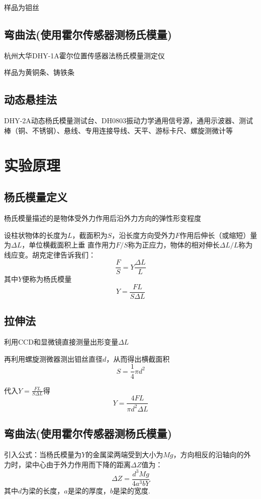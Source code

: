 \documentclass[11pt]{article}
\begin{document}
	样品为钼丝
	
	\subsection{弯曲法(使用霍尔传感器测杨氏模量)}
	杭州大华DHY-1A霍尔位置传感器法杨氏模量测定仪
	
	样品为黄铜条、铸铁条
	
	\subsection{动态悬挂法}
	DHY-2A动态杨氏模量测试台、DH0803振动力学通用信号源，通用示波器、测试棒（铜、不锈钢）、悬线、专用连接导线、天平、游标卡尺、螺旋测微计等
	
	
	
	\section{实验原理}
	
	\subsection{杨氏模量定义}
	杨氏模量描述的是物体受外力作用后沿外力方向的弹性形变程度
	
	设柱状物体的长度为$L$，截面积为$S$，沿长度方向受外力$F$作用后伸长（或缩短）量为$\Delta L$，单位横截面积上垂
	直作用力$F/S$称为正应力，物体的相对伸长$\Delta L/L$称为线应变。胡克定律告诉我们：
	\[
	\frac{F}{S}=Y\frac{\Delta L}{L} 
	\]
	其中$Y$便称为杨氏模量
	\[Y=\frac{F L}{S \Delta L}\]
	
	\subsection{拉伸法}
	利用CCD和显微镜直接测量出形变量$\Delta L$
	
	再利用螺旋测微器测出钼丝直径$d$，从而得出横截面积\[S=\frac{1}{4} \pi d^2\]
	
	代入\(Y=\frac{F L}{S \Delta L}\)得\[Y=\frac{4F L}{\pi d^2 \Delta L}\]
	
	\subsection{弯曲法(使用霍尔传感器测杨氏模量)}
	引入公式：当杨氏模量为$Y$的金属梁两端受到大小为$Mg$，方向相反的沿轴向的外力时，梁中心由于外力作用而下降的距离$\Delta Z$值为：
	\[\Delta Z=\frac{d^3 Mg}{4a^3 b Y}\]
	其中$d$为梁的长度，$a$是梁的厚度，$b$是梁的宽度.
	
\end{document}
